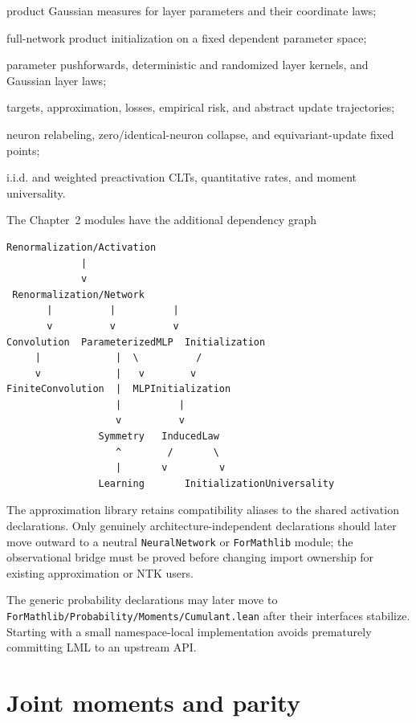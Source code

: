 \begin{description}
    product Gaussian measures for layer parameters and their coordinate laws;
  \item[\texttt{Renormalization/MLPInitialization.lean}]
    full-network product initialization on a fixed dependent parameter space;
  \item[\texttt{Renormalization/InducedLaw.lean}]
    parameter pushforwards, deterministic and randomized layer kernels, and Gaussian layer laws;
  \item[\texttt{Renormalization/Learning.lean}]
    targets, approximation, losses, empirical risk, and abstract update trajectories;
  \item[\texttt{Renormalization/Symmetry.lean}]
    neuron relabeling, zero/identical-neuron collapse, and equivariant-update fixed points;
  \item[\texttt{Renormalization/InitializationUniversality.lean}]
    i.i.d. and weighted preactivation CLTs, quantitative rates, and moment universality.
\end{description}

The Chapter~2 modules have the additional dependency graph
\begin{verbatim}
Renormalization/Activation
             |
             v
 Renormalization/Network
       |          |          |
       v          v          v
Convolution  ParameterizedMLP  Initialization
     |             |  \          /
     v             |   v        v
FiniteConvolution  |  MLPInitialization
                   |          |
                   v          v
                Symmetry   InducedLaw
                   ^        /       \
                   |       v         v
                Learning       InitializationUniversality
\end{verbatim}
The approximation library retains compatibility aliases to the shared activation declarations.
Only genuinely architecture-independent declarations should later move outward to a neutral
\texttt{NeuralNetwork} or \texttt{ForMathlib} module; the observational bridge must be proved before
changing import ownership for existing approximation or NTK users.

The generic probability declarations may later move to
\texttt{ForMathlib/Probability/Moments/Cumulant.lean} after their interfaces stabilize.  Starting
with a small namespace-local implementation avoids prematurely committing LML to an upstream API.

\section{Joint moments and parity}

